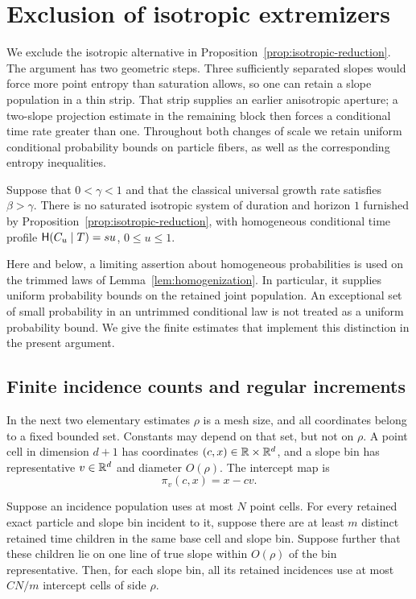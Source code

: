 \section{Exclusion of isotropic extremizers}
\label{sec:isotropic}

We exclude the isotropic alternative in
Proposition~\ref{prop:isotropic-reduction}. The argument has two
geometric steps. Three sufficiently separated slopes would force
more point entropy than saturation allows, so one can retain a slope
population in a thin strip. That strip supplies an earlier anisotropic aperture;
a two-slope projection estimate in the remaining block then forces
a conditional time rate greater than one. Throughout both changes
of scale we retain uniform conditional probability bounds on particle
fibers, as well as the corresponding entropy inequalities.

\begin{proposition}
\label{prop:isotropic-exclusion}
Suppose that $0<\gamma<1$ and that the classical universal growth rate satisfies
$\beta>\gamma$. There is no saturated isotropic system of duration and horizon
$1$ furnished by Proposition~\ref{prop:isotropic-reduction}, with homogeneous
conditional time profile $\mathsf H(C_u\mid T)=su$, $0\leq u\leq1$.
\end{proposition}

Here and below, a limiting assertion about homogeneous probabilities is used
on the trimmed laws of Lemma~\ref{lem:homogenization}. In particular, it supplies
uniform probability bounds on the retained joint population. An exceptional
set of small probability in an untrimmed conditional law is not treated as a
uniform probability bound. We give the finite estimates that implement this
distinction in the present argument.

\subsection{Finite incidence counts and regular increments}

In the next two elementary estimates $\rho$ is a mesh size, and all coordinates
belong to a fixed bounded set. Constants may depend on that set, but not on
$\rho$. A point cell in dimension $d+1$ has coordinates $(c,x)\in\mathbb R\times
\mathbb R^d$, and a slope bin has representative $v\in\mathbb R^d$ and diameter $O(\rho)$.
The intercept map is
\[
 \pi_v(c,x)=x-cv.
\]

\begin{lemma}
\label{lem:isotropic-intercepts}
Suppose an incidence population uses at most $N$ point cells. For every
retained exact particle and slope bin incident to it, suppose there are at
least $m$ distinct retained time children in the same base cell and slope bin.
Suppose further that these children lie on one line of true slope within
$O(\rho)$ of the bin representative. Then, for each slope bin, all its retained
incidences use at most $CN/m$ intercept cells of side $\rho$.
\end{lemma}

